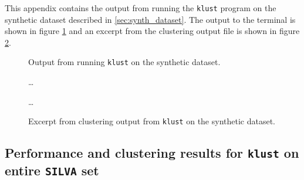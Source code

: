 This appendix contains the output from running the \texttt{klust} program on
the synthetic dataset described in \ref{sec:synth_dataset}. The output to the
terminal is shown in figure \ref{fig:synth_silva_output} and an excerpt from
the clustering output file is shown in figure \ref{fig:synth_silva_clustering}.

\begin{figure}[H]
  \centering
  
  \caption{Output from running \texttt{klust} on the synthetic dataset.}
  \label{fig:synth_silva_output}
\end{figure}

\begin{figure}[H]
  \centering
  
  \dots
  
  \dots
  
  \caption{Excerpt from clustering output from \texttt{klust} on the
    synthetic dataset.}
  \label{fig:synth_silva_clustering}
\end{figure}


\subsection{Performance and clustering results for \texttt{klust} on entire \texttt{SILVA} set}
\label{app:performance_results_full_SILVA}

